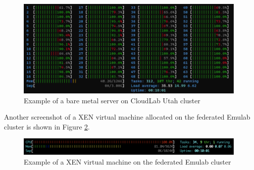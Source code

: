 \documentclass{article}
\begin{document}
\begin{figure}
\centering
\includegraphics[width=\textwidth]{images/testbed.png}
\caption{Example of a bare metal server on CloudLab Utah cluster}
\label{fig:utah}
\end{figure}

Another screenshot of a XEN virtual machine allocated on the federated Emulab cluster is shown in Figure \ref{fig:vm}.

\begin{figure}
\centering
\includegraphics[width=\textwidth]{images/testbed vm.png}
\caption{Example of a XEN virtual machine on the federated Emulab cluster}
\label{fig:vm}
\end{figure}

\printbibliography
\end{document}
